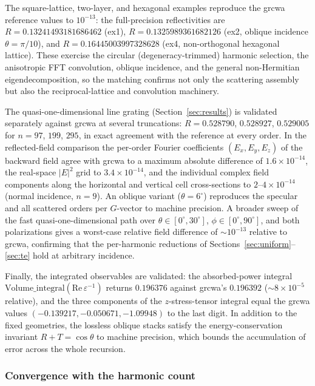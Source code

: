 \documentclass[11pt]{article}
\theoremstyle{remark}
\newcommand{\eps}{\varepsilon}
\begin{document}
The square-lattice, two-layer, and hexagonal examples reproduce the grcwa
reference values to $10^{-13}$: the full-precision reflectivities are
$R=0.13241493181686462$ (ex1), $R=0.1325989361682126$ (ex2, oblique
incidence $\theta=\pi/10$), and $R=0.16445003997328628$ (ex4, non-orthogonal
hexagonal lattice).  These exercise the circular (degeneracy-trimmed) harmonic
selection, the anisotropic FFT convolution, oblique incidence, and the general
non-Hermitian eigendecomposition, so the matching confirms not only the
scattering assembly but also the reciprocal-lattice and convolution machinery.

The quasi-one-dimensional line grating (Section~\ref{sec:results}) is validated
separately against grcwa at several truncations: $R=0.528790$, $0.528927$,
$0.529005$ for $n=97$, $199$, $295$, in exact agreement with the reference at
every order.  In the reflected-field comparison the per-order Fourier
coefficients $(E_x,E_y,E_z)$ of the backward field agree with grcwa to a
maximum absolute difference of $1.6\times10^{-14}$, the real-space
$|E|^2$ grid to $3.4\times10^{-14}$, and the individual complex field
components along the horizontal and vertical cell cross-sections to
$2$--$4\times10^{-14}$ (normal incidence, $n=9$).  An oblique variant
($\theta=6^\circ$) reproduces the specular and all scattered orders per
$G$-vector to machine precision.  A broader sweep of the fast
quasi-one-dimensional path over $\theta\in[0^\circ,30^\circ]$,
$\phi\in[0^\circ,90^\circ]$, and both polarizations gives a worst-case
relative field difference of $\sim10^{-13}$ relative to grcwa, confirming that
the per-harmonic reductions of Sections~\ref{sec:uniform}--\ref{sec:te} hold at
arbitrary incidence.

Finally, the integrated observables are validated: the absorbed-power integral
$\mathrm{Volume\_integral}(\mathrm{Re}\,\eps^{-1})$ returns $0.196376$ against
grcwa's $0.196392$ ($\sim8\times10^{-5}$ relative), and the three components of
the $z$-stress-tensor integral equal the grcwa values
$(-0.139217,-0.050671,-1.09948)$ to the last digit.  In addition to the fixed
geometries, the lossless oblique stacks satisfy the energy-conservation
invariant $R+T=\cos\theta$ to machine precision, which bounds the accumulation
of error across the whole recursion.

\subsubsection{Convergence with the harmonic count}
\end{document}
